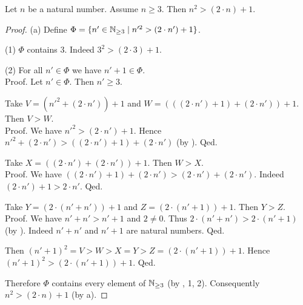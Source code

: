 \documentclass[10pt]{article}
\begin{document}
  \begin{forthel}
    \begin{proposition}
      Let $n$ be a natural number.
      Assume $n \geq 3$.
      Then $n^{2} > (2 \cdot n) + 1$.
    \end{proposition}
    \begin{proof}
      (a) Define $\Phi = \{ n' \in \mathbb{N}_{\geq 3} \mid n'^{2} > (2 \cdot n') + 1 \}$.

      (1) $\Phi$ contains $3$.
      Indeed $3^{2} > (2 \cdot 3) + 1$.

      (2) For all $n' \in \Phi$ we have $n' + 1 \in \Phi$. \\
      Proof.
        Let $n' \in \Phi$.
        Then $n' \geq 3$.

        Take $V = (n'^{2} + (2 \cdot n')) + 1$ and $W = (((2 \cdot n') + 1) + (2 \cdot n')) + 1$.
        Then $V > W$. \\
        Proof.
          We have $n'^{2} > (2 \cdot n') + 1$.
          Hence $n'^{2} + (2 \cdot n') > ((2 \cdot n') + 1) + (2 \cdot n')$ (by ).
        Qed.

        Take $X = ((2 \cdot n') + (2 \cdot n')) + 1$.
        Then $W > X$. \\
        Proof.
          We have $((2 \cdot n') + 1) + (2 \cdot n') > (2 \cdot n') + (2 \cdot n')$.
          Indeed $(2 \cdot n') + 1 > 2 \cdot n'$.
        Qed.

        Take $Y = (2 \cdot (n' + n')) + 1$ and $Z = (2 \cdot (n' + 1)) + 1$.
        Then $Y > Z$. \\
        Proof.
          We have $n' + n' > n' + 1$ and $2 \neq 0$.
          Thus $2 \cdot (n' + n') > 2 \cdot (n' + 1)$ (by ).
          Indeed $n' + n'$ and $n' + 1$ are natural numbers.
        Qed.

        Then $(n' + 1)^{2} = V > W > X = Y > Z = (2 \cdot (n' + 1)) + 1$.
        Hence $(n' + 1)^{2} > (2 \cdot (n' + 1)) + 1$.
      Qed.

      Therefore $\Phi$ contains every element of $\mathbb{N}_{\geq 3}$ (by , 1, 2).
      Consequently $n^{2} > (2 \cdot n) + 1$ (by a).
    \end{proof}
  \end{forthel}
\end{document}
